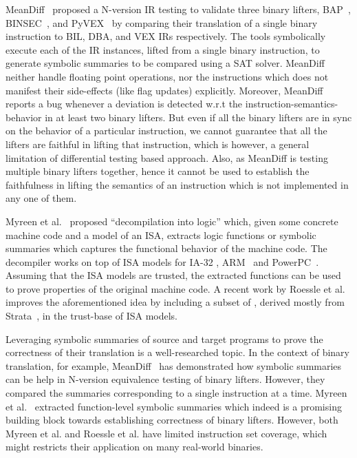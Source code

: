 MeanDiff~\cite{ASE2017} proposed a N-version IR testing to validate three binary
lifters, BAP~\cite{BAP:CAV11}, BINSEC~\cite{BINSEC2011}, and PyVEX~\cite{PYVEX}
by comparing their translation of a single binary instruction to BIL, DBA, and VEX IRs respectively.
The tools symbolically execute each of the IR instances, lifted from a single
binary instruction, to generate symbolic summaries to be compared using a SAT
solver. MeanDiff neither handle floating point operations, nor the instructions
which does not manifest their side-effects (like flag updates) explicitly.
Moreover, MeanDiff reports a bug whenever a deviation is detected w.r.t the
instruction-semantics-behavior in at least two binary lifters. But even if all
the binary lifters are in sync on the behavior of a particular instruction, we
cannot guarantee that all the lifters are faithful in lifting that instruction,
       which is however, a general limitation of differential testing based
       approach. Also, as MeanDiff is testing multiple binary lifters
       together, hence it cannot be used to establish the faithfulness in
       lifting the semantics of an instruction which is not implemented in any one
       of them.

Myreen et al.~\cite{Myreen:FMCAD:2008,Myreen:FMCAD:2012} proposed
``decompilation into logic'' which, given some concrete machine code and a
model of an ISA, extracts logic functions or symbolic summaries which captures
the functional behavior of the machine code. The decompiler works on top of ISA
models for IA-32 \cite{Karl2003}, ARM~\cite{Fox2003} and
PowerPC~\cite{Leroy:2006}. Assuming that the ISA models are trusted, the
extracted functions can be used to prove properties of the original machine
code. A recent work by Roessle et al.~\cite{Roessle:CPP19} improves the
aforementioned idea  by including a subset of \ISA, derived mostly from
Strata~\cite{Heule2016a}, in the trust-base of ISA models.   

Leveraging symbolic summaries of source and target programs to prove the
correctness of  their translation is a well-researched topic. In the context of
binary translation, for example, MeanDiff~\cite{ASE2017} has demonstrated how
symbolic summaries can be help in N-version equivalence testing of binary
lifters. However, they compared the summaries corresponding to a single
instruction at a time. Myreen et al.~\cite{Myreen:FMCAD:2008,Myreen:FMCAD:2012}
extracted function-level symbolic summaries which indeed is a promising
building block towards establishing correctness of binary lifters. However, both Myreen et al. and
         Roessle et al. have limited \ISA instruction set coverage, which
         might restricts their application on many  real-world binaries.


